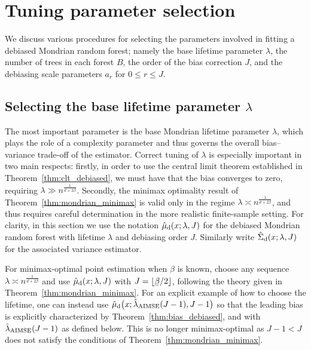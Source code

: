 \section{Tuning parameter selection}%
\label{sec:parameter_selection}

We discuss various procedures for selecting the parameters
involved in fitting a debiased Mondrian random forest;
namely the base lifetime parameter $\lambda$,
the number of trees in each forest $B$,
the order of the bias correction $J$,
and the debiasing scale parameters $a_r$ for $0 \leq r \leq J$.

\subsection{Selecting the base lifetime parameter
\texorpdfstring{$\lambda$}{lambda}}%
\label{sec:lifetime_selection}

The most important parameter is the base Mondrian lifetime parameter $\lambda$,
which plays the role of a complexity parameter and thus governs the overall
bias--variance trade-off of the estimator.
Correct tuning of $\lambda$ is especially important in two main respects:
%
firstly, in order to use the central limit theorem established in
Theorem~\ref{thm:clt_debiased}, we must have that the bias converges to zero,
requiring $\lambda \gg n^{\frac{1}{d + 2\beta}}$.
%
Secondly, the minimax optimality result of Theorem~\ref{thm:mondrian_minimax}
is valid
only in the regime $\lambda \asymp n^{\frac{1}{d + 2\beta}}$,
and thus requires careful determination
in the more realistic finite-sample setting.
For clarity, in this section we use the notation
$\hat\mu_{\mathrm{d}}(x; \lambda, J)$ for the debiased Mondrian random forest
with lifetime $\lambda$ and debiasing order $J$.
Similarly write $\hat\Sigma_{\mathrm{d}}(x; \lambda, J)$ for the
associated variance estimator.

For minimax-optimal point estimation when $\beta$ is known,
choose any sequence $\lambda \asymp n^{\frac{1}{d + 2\beta}}$
and use $\hat\mu_{\mathrm{d}}(x; \lambda, J)$ with
$J = \lfloor \flbeta / 2 \rfloor$,
following the theory given in Theorem~\ref{thm:mondrian_minimax}.
For an explicit example of how to choose the lifetime,
one can instead use
$\hat\mu_{\mathrm{d}}\big(x; \hat\lambda_{\operatorname{AIMSE}}(J-1), J-1\big)$
so that the leading bias is explicitly characterized by
Theorem~\ref{thm:bias_debiased},
and with $\hat\lambda_{\operatorname{AIMSE}}(J-1)$ as defined below.
This is no longer minimax-optimal as $J-1 < J$
does not satisfy the conditions of Theorem~\ref{thm:mondrian_minimax}.

